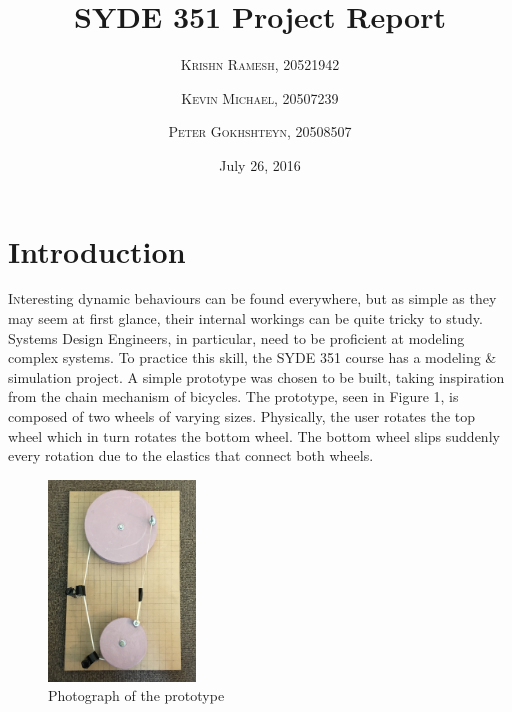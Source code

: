 \documentclass[twoside,twocolumn]{article}
\title{SYDE 351 Project Report} %
\author{%
\textsc{Krishn Ramesh, 20521942} \\[1ex]
\and
\textsc{Kevin Michael, 20507239} \\[1ex]
\and
\textsc{Peter Gokhshteyn, 20508507} \\[1ex]
}
\date{July 26, 2016} %
\begin{document}
\maketitle


\section{Introduction}

\lettrine[nindent=0em,lines=3]{I} nteresting dynamic behaviours can be found everywhere, but as simple as they may seem at first glance, their internal workings can be quite tricky to study. Systems Design Engineers, in particular, need to be proficient at modeling complex systems. To practice this skill, the SYDE 351 course has a modeling \& simulation project. A simple prototype was chosen to be built, taking inspiration from the chain mechanism of bicycles. The prototype, seen in Figure 1, is composed of two wheels of varying sizes. Physically, the user rotates the top wheel which in turn rotates the bottom wheel. The bottom wheel slips suddenly every rotation due to the elastics that connect both wheels.

\begin{figure}[!ht]
    \caption{Photograph of the prototype}
    \centering
        \includegraphics[width=0.35\textwidth]{prototype.jpg}
\end{figure}


\end{document}
